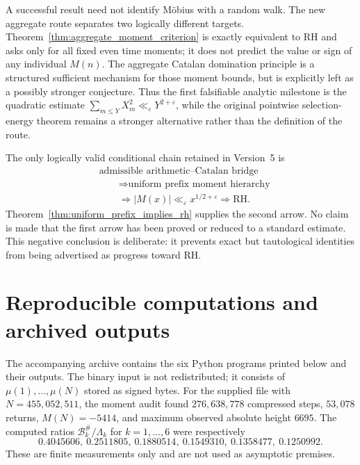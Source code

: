 \documentclass[11pt]{amsart}
\numberwithin{equation}{section}
\theoremstyle{plain}
\theoremstyle{definition}
\theoremstyle{remark}
\newcommand{\Mob}{\mu}
\newcommand{\Mert}{M}
\newcommand{\eps}{\varepsilon}
\begin{document}
A successful result need not identify M\"obius with a random walk.  The new
aggregate route separates two logically different targets.  Theorem~\ref{thm:aggregate_moment_criterion}
is exactly equivalent to RH and asks only for all fixed even time moments; it
does not predict the value or sign of any individual $M(n)$.  The aggregate
Catalan domination principle is a structured sufficient mechanism for those
moment bounds, but is explicitly left as a possibly stronger conjecture.  Thus
the first falsifiable analytic milestone is the quadratic estimate
$\sum_{m\le Y}X_m^2\ll_\varepsilon Y^{2+\varepsilon}$, while the original
pointwise selection-energy theorem remains a stronger alternative rather than
the definition of the route.

The only logically valid conditional chain retained in Version~5 is
\begin{equation}
\begin{aligned}
&\text{admissible arithmetic--Catalan bridge}\\
&\qquad\Longrightarrow \text{uniform prefix moment hierarchy}\\
&\qquad\Longrightarrow
|\Mert(x)|\ll_\eps x^{1/2+\eps}
\Longrightarrow \mathrm{RH}.
\end{aligned}
\end{equation}
Theorem~\ref{thm:uniform_prefix_implies_rh} supplies the second arrow.  No
claim is made that the first arrow has been proved or reduced to a standard
estimate.  This negative conclusion is deliberate: it prevents exact but
tautological identities from being advertised as progress toward RH.

\appendix

\section{Reproducible computations and archived outputs}
\label{app:reproducibility}

The accompanying archive contains the six Python programs printed below and
their outputs.  The binary input is not redistributed; it consists of
$\Mob(1),\ldots,\Mob(N)$ stored as signed bytes.  For the supplied file with
$N=455{,}052{,}511$, the moment audit found $276{,}638{,}778$ compressed steps,
$53{,}078$ returns, $\Mert(N)=-5414$, and maximum observed absolute height
$6695$.  The computed ratios
$\mathcal B_k^{\#}/\Lambda_k$ for $k=1,\ldots,6$ were respectively
\begin{equation}
0.4045606,\ 0.2511805,\ 0.1880514,\ 0.1549310,\ 0.1358477,\ 0.1250992.
\end{equation}
These are finite measurements only and are not used as asymptotic premises.
\end{document}
